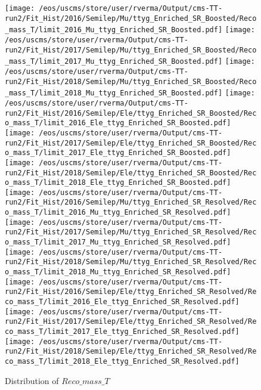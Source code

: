 \begin{figure}
\centering
\texttt{[image: /eos/uscms/store/user/rverma/Output/cms-TT-run2/Fit\_Hist/2016/Semilep/Mu/ttyg\_Enriched\_SR\_Boosted/Reco\_mass\_T/limit\_2016\_Mu\_ttyg\_Enriched\_SR\_Boosted.pdf]}
\texttt{[image: /eos/uscms/store/user/rverma/Output/cms-TT-run2/Fit\_Hist/2017/Semilep/Mu/ttyg\_Enriched\_SR\_Boosted/Reco\_mass\_T/limit\_2017\_Mu\_ttyg\_Enriched\_SR\_Boosted.pdf]}
\texttt{[image: /eos/uscms/store/user/rverma/Output/cms-TT-run2/Fit\_Hist/2018/Semilep/Mu/ttyg\_Enriched\_SR\_Boosted/Reco\_mass\_T/limit\_2018\_Mu\_ttyg\_Enriched\_SR\_Boosted.pdf]}
\texttt{[image: /eos/uscms/store/user/rverma/Output/cms-TT-run2/Fit\_Hist/2016/Semilep/Ele/ttyg\_Enriched\_SR\_Boosted/Reco\_mass\_T/limit\_2016\_Ele\_ttyg\_Enriched\_SR\_Boosted.pdf]}
\texttt{[image: /eos/uscms/store/user/rverma/Output/cms-TT-run2/Fit\_Hist/2017/Semilep/Ele/ttyg\_Enriched\_SR\_Boosted/Reco\_mass\_T/limit\_2017\_Ele\_ttyg\_Enriched\_SR\_Boosted.pdf]}
\texttt{[image: /eos/uscms/store/user/rverma/Output/cms-TT-run2/Fit\_Hist/2018/Semilep/Ele/ttyg\_Enriched\_SR\_Boosted/Reco\_mass\_T/limit\_2018\_Ele\_ttyg\_Enriched\_SR\_Boosted.pdf]}
\texttt{[image: /eos/uscms/store/user/rverma/Output/cms-TT-run2/Fit\_Hist/2016/Semilep/Mu/ttyg\_Enriched\_SR\_Resolved/Reco\_mass\_T/limit\_2016\_Mu\_ttyg\_Enriched\_SR\_Resolved.pdf]}
\texttt{[image: /eos/uscms/store/user/rverma/Output/cms-TT-run2/Fit\_Hist/2017/Semilep/Mu/ttyg\_Enriched\_SR\_Resolved/Reco\_mass\_T/limit\_2017\_Mu\_ttyg\_Enriched\_SR\_Resolved.pdf]}
\texttt{[image: /eos/uscms/store/user/rverma/Output/cms-TT-run2/Fit\_Hist/2018/Semilep/Mu/ttyg\_Enriched\_SR\_Resolved/Reco\_mass\_T/limit\_2018\_Mu\_ttyg\_Enriched\_SR\_Resolved.pdf]}
\texttt{[image: /eos/uscms/store/user/rverma/Output/cms-TT-run2/Fit\_Hist/2016/Semilep/Ele/ttyg\_Enriched\_SR\_Resolved/Reco\_mass\_T/limit\_2016\_Ele\_ttyg\_Enriched\_SR\_Resolved.pdf]}
\texttt{[image: /eos/uscms/store/user/rverma/Output/cms-TT-run2/Fit\_Hist/2017/Semilep/Ele/ttyg\_Enriched\_SR\_Resolved/Reco\_mass\_T/limit\_2017\_Ele\_ttyg\_Enriched\_SR\_Resolved.pdf]}
\texttt{[image: /eos/uscms/store/user/rverma/Output/cms-TT-run2/Fit\_Hist/2018/Semilep/Ele/ttyg\_Enriched\_SR\_Resolved/Reco\_mass\_T/limit\_2018\_Ele\_ttyg\_Enriched\_SR\_Resolved.pdf]}
\caption{Distribution of $Reco\_mass\_T$}
\end{figure}

